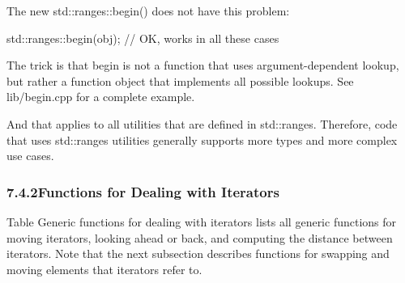 The new std::ranges::begin() does not have this problem:

\begin{cpp}
std::ranges::begin(obj); // OK, works in all these cases
\end{cpp}

The trick is that begin is not a function that uses argument-dependent lookup, but rather a function object that implements all possible lookups. See lib/begin.cpp for a complete example.

And that applies to all utilities that are defined in std::ranges. Therefore, code that uses std::ranges utilities generally supports more types and more complex use cases.


\subsubsection*{ 7.4.2\hspace{0.2cm}Functions for Dealing with Iterators}

Table Generic functions for dealing with iterators lists all generic functions for moving iterators, looking ahead or back, and computing the distance between iterators. Note that the next subsection describes functions for swapping and moving elements that iterators refer to.

